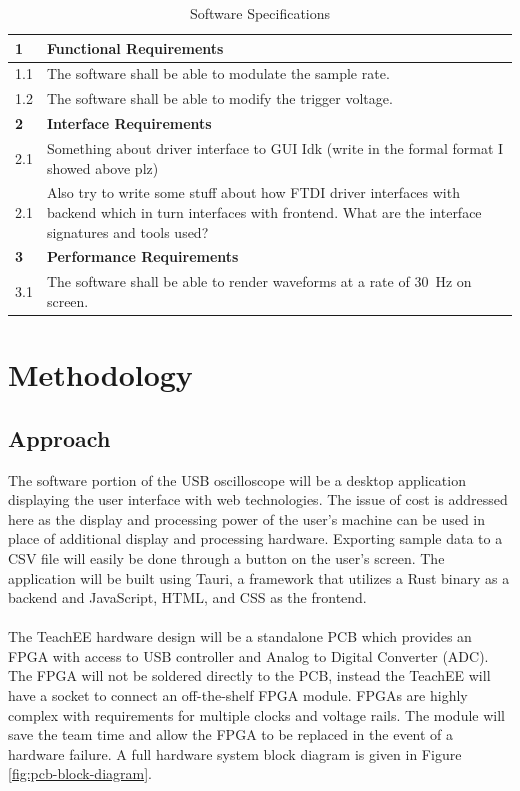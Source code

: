 \documentclass[letterpaper,12pt]{article}
\begin{document}
\begin{table}[h!]
    \caption{Software Specifications}
    \begin{tabularx}{\textwidth}{l|l}
        \textbf{1} & \textbf{Functional Requirements}\\
        \hline
        1.1 & The software shall be able to modulate the sample rate. \\
        1.2 & The software shall be able to modify the trigger voltage. \\
        \hline
        \textbf{2} & \textbf{Interface Requirements} \\
        \hline
        2.1 & Something about driver interface to GUI Idk (write in the formal format I showed above plz) \\
        2.1 & Also try to write some stuff about how FTDI driver interfaces with backend which in turn interfaces with frontend. What are the interface signatures and tools used? \\
        \hline
        \textbf{3} & \textbf{Performance Requirements} \\
        \hline
        3.1 & The software shall be able to render waveforms at a rate of \SI{30}{\hertz} on screen.
    \end{tabularx} 
\label{sw:specs-table}
\end{table}


\section{Methodology} %

\subsection{Approach}

The software portion of the USB oscilloscope will be a desktop application
displaying the user interface with web technologies. The issue of cost is
addressed here as the display and processing power of the user's machine
can be used in place of additional display and processing hardware. Exporting
sample data to a CSV file will easily be done through a button on the user's
screen. The application will be built using Tauri, a framework that utilizes
a Rust binary as a backend and JavaScript, HTML, and CSS as the frontend.
\\~\\
The TeachEE hardware design will be a standalone PCB which provides an FPGA with
access to USB controller and Analog to Digital Converter (ADC). The FPGA will
not be soldered directly to the PCB, instead the TeachEE will have a socket to
connect an off-the-shelf FPGA module. FPGAs are highly complex with requirements
for multiple clocks and voltage rails. The module will save the team time and
allow the FPGA to be replaced in the event of a hardware failure. A full
hardware system block diagram is given in Figure \ref{fig:pcb-block-diagram}.
\end{document}
